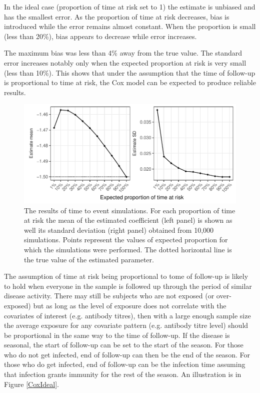 \documentclass[12pt]{article}
\begin{document}
In the ideal case (proportion of time at risk set to 1) the estimate is unbiased and has the smallest error. As the proportion of time at risk decreases, bias is introduced while the error remains almost constant. When the proportion is small (less than 20\%), bias appears to decrease while error increases.

The maximum bias was less than 4\% away from the true value. The standard error increases notably only when the expected proportion at risk is very small (less than 10\%). This shows that under the assumption that the time of follow-up is proportional to time at risk, the Cox model can be expected to produce reliable results.

\pagebreak

\begin{figure}[htp]
	\centering
	\includegraphics[width=1\textwidth]{../cox-tarprop-plot/risk.pdf}
	\caption{
	The results of time to event simulations. For each proportion of time at risk the mean of the estimated coefficient (left panel) is shown as well its standard deviation (right panel) obtained from 10,000 simulations. Points represent the values of expected proportion for which the simulations were performed. The dotted horizontal line is the true value of the estimated parameter.
	}
	\label{CoxSimResults}
\end{figure}

The assumption of time at risk being proportional to tome of follow-up is likely to hold when everyone in the sample is followed up through the period of similar disease activity. There may still be subjects who are not exposed (or over-exposed) but as long as the level of exposure does not correlate with the covariates of interest (e.g. antibody titres), then with a large enough sample size the average exposure for any covariate pattern (e.g. antibody titre level) should be proportional in the same way to the time of follow-up. If the disease is seasonal, the start of follow-up can be set to the start of the season. For those who do not get infected, end of follow-up can then be the end of the season. For those who do get infected, end of follow-up can be the infection time assuming that infection grants immunity for the rest of the season. An illustration is in Figure \ref{CoxIdeal}.
\end{document}
